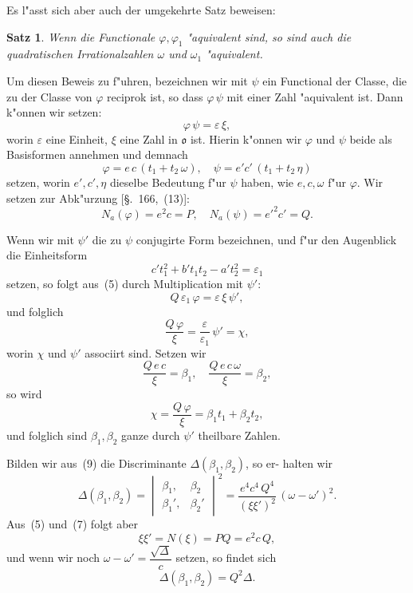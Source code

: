 \documentclass[12pt,a4paper]{article}
\theoremstyle{weber}
\newtheorem*{satz}{Satz}
\begin{document}
Es l"asst sich aber auch der umgekehrte Satz beweisen:

\begin{satz}
Wenn die Functionale $\varphi, \varphi_1$ "aquivalent sind, so
sind auch die quadratischen Irrationalzahlen
$\omega$ und $\omega_1$ "aquivalent.
\end{satz}

Um diesen Beweis zu f"uhren, bezeichnen wir mit $\psi$ ein
Functional der Classe, die zu der Classe von $\varphi$ reciprok ist,
so dass $\varphi\,\psi$ mit einer Zahl "aquivalent ist. Dann k"onnen wir
setzen:
\begin{equation}\label{eq:s167-5}
\varphi\,\psi = \varepsilon\,\xi,
\end{equation}
worin $\varepsilon$ eine Einheit, $\xi$ eine Zahl in $\mathfrak{o}$ ist. Hierin k"onnen wir
$\varphi$ und $\psi$ beide als Basisformen annehmen und demnach
\begin{equation}\label{eq:s167-6}
\varphi = e\,c\,(t_1 + t_2\,\omega), \quad \psi = e'c'\,(t_1 + t_2\,\eta)
\end{equation}
setzen, worin $e', c', \eta$ dieselbe Bedeutung f"ur $\psi$ haben, wie $e, c, \omega$
f"ur $\varphi$. Wir setzen zur Abk"urzung [\S.~166,~(13)]:
\begin{equation}\label{eq:s167-7}
N_a(\varphi) = e^2c = P, \quad N_a(\psi) = e'^2c' = Q.
\end{equation}

Wenn wir mit $\psi'$ die zu $\psi$ conjugirte Form bezeichnen, und
f"ur den Augenblick die Einheitsform
\[
c't_1^2 + b't_1t_2 - a't_2^2 = \varepsilon_1
\]
setzen, so folgt aus~(5) durch Multiplication mit $\psi'$:
\[
Q\,\varepsilon_1\,\varphi = \varepsilon\,\xi\,\psi',
\]
und folglich
\begin{equation}\label{eq:s167-8}
\frac{Q\,\varphi}{\xi} = \frac{\varepsilon}{\varepsilon_1}\,\psi' = \chi,
\end{equation}
worin $\chi$ und $\psi'$ associirt sind. Setzen wir
\begin{equation}\label{eq:s167-9}
\frac{Q\,e\,c}{\xi} = \beta_1, \quad \frac{Q\,e\,c\,\omega}{\xi} = \beta_2,
\end{equation}
so wird
\[
\chi = \frac{Q\,\varphi}{\xi} = \beta_1t_1 + \beta_2t_2,
\]
und folglich sind $\beta_1, \beta_2$ ganze durch $\psi'$ theilbare Zahlen.

Bilden wir aus~(9) die Discriminante $\varDelta(\beta_1, \beta_2)$, so er-
halten wir
\begin{equation}\label{eq:s167-10}
\varDelta(\beta_1, \beta_2) = \begin{vmatrix} \beta_1, & \beta_2 \\ \beta_1', & \beta_2' \end{vmatrix}^2 = \frac{e^4c^4\,Q^4}{(\xi\xi')^2}\,(\omega - \omega')^2.
\end{equation}
Aus~(5) und~(7) folgt aber
\[
\xi\xi' = N(\xi) = PQ = e^2c\,Q,
\]
und wenn wir noch $\omega - \omega' = \dfrac{\sqrt{\varDelta}}{c}$ setzen, so findet sich
\begin{equation}\label{eq:s167-11}
\varDelta(\beta_1, \beta_2) = Q^2\varDelta.
\end{equation}
\end{document}

